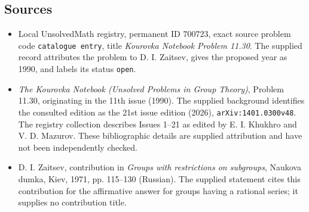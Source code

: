 \documentclass[11pt]{article}
\begin{document}
\subsection{Sources}
\begin{itemize}
\item Local UnsolvedMath registry, permanent ID \(700723\), exact source problem code \texttt{catalogue entry}, title \emph{Kourovka Notebook Problem 11.30}. The supplied record attributes the problem to D. I. Zaitsev, gives the proposed year as 1990, and labels its status \texttt{open}.
\item \emph{The Kourovka Notebook (Unsolved Problems in Group Theory)}, Problem 11.30, originating in the 11th issue (1990). The supplied background identifies the consulted edition as the 21st issue edition (2026), \texttt{arXiv:1401.0300v48}. The registry collection describes Issues 1--21 as edited by E. I. Khukhro and V. D. Mazurov. These bibliographic details are supplied attribution and have not been independently checked.
\item D. I. Zaitsev, contribution in \emph{Groups with restrictions on subgroups}, Naukova dumka, Kiev, 1971, pp. 115--130 (Russian). The supplied statement cites this contribution for the affirmative answer for groups having a rational series; it supplies no contribution title.
\end{itemize}
\end{document}
